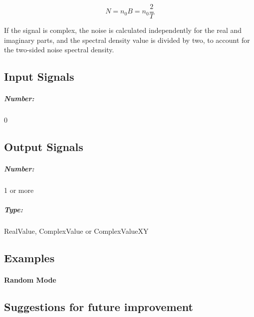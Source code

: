 \begin{equation}
N = n_0 B = n_0 \frac{2}{T}
\end{equation}

If the signal is complex, the noise is calculated independently for the real and imaginary parts, and the spectral density value is divided by two, to account for the two-sided noise spectral density.



\subsection*{Input Signals}


\subparagraph*{Number:} 0

\subsection*{Output Signals}

\subparagraph*{Number:} 1 or more

\subparagraph*{Type:} RealValue, ComplexValue or ComplexValueXY

\subsection*{Examples}

\paragraph*{Random Mode}

\subsection*{Suggestions for future improvement}
